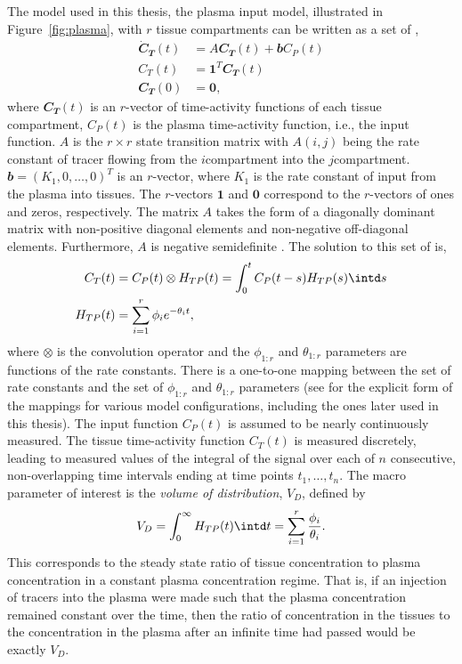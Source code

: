 The model used in this thesis, the plasma input model, illustrated in
Figure~\ref{fig:plasma}, with $r$ tissue compartments can be written as a set
of \ode,
\begin{align*}
  \dot{\mathbfit{C}}_{\mathbfit{T}}(t)
  & = A\mathbfit{C}_{\mathbfit{T}}(t) + \mathbfit{b} C_P(t)\\
  C_T(t)
  & = \mathbf{1}^T\mathbfit{C}_{\mathbfit{T}}(t) \\
  \mathbfit{C}_{\mathbfit{T}}(0) & = \mathbf{0},
\end{align*}
where $\mathbfit{C}_{\mathbfit{T}}(t)$ is an $r$-vector of time-activity
functions of each tissue compartment, $C_P(t)$ is the plasma time-activity
function, i.e., the input function. $A$ is the $r \times r$ state transition
matrix with $A(i,j)$ being the rate constant of tracer flowing from the
$i$\xth compartment into the $j$\xth compartment. $\mathbfit{b} = (K_1, 0,
\dots, 0)^T$ is an $r$-vector, where $K_1$ is the rate constant of input from
the plasma into tissues. The $r$-vectors $\mathbf{1}$ and $\mathbf{0}$
correspond to the $r$-vectors of ones and zeros, respectively. The matrix $A$
takes the form of a diagonally dominant matrix with non-positive diagonal
elements and non-negative off-diagonal elements. Furthermore, $A$ is negative
semidefinite \cite{Gunn:2001cx}. The solution to this set of \ode is,
\begin{align}
  C_T(t) & = C_P(t) \otimes H_{TP}(t) = \int_0^t C_P(t-s) H_{TP}(s)\intd s
  \label{eq:CT} \\
  H_{TP}(t) & = \sum_{i=1}^r \phi_i e^{-\theta_i t},
  \label{eq:HTP}
\end{align}
where $\otimes$ is the convolution operator and the $\phi_{1:r}$ and
$\theta_{1:r}$ parameters are functions of the rate constants. There is a
one-to-one mapping between the set of rate constants and the set of
$\phi_{1:r}$ and $\theta_{1:r}$ parameters (see \cite{Gunn:2001cx} for the
explicit form of the mappings for various model configurations, including the
ones later used in this thesis). The input function $C_P(t)$ is assumed to be
nearly continuously measured. The tissue time-activity function $C_T(t)$ is
measured discretely, leading to measured values of the integral of the signal
over each of $n$ consecutive, non-overlapping time intervals ending at time
points $t_1, \dots, t_n$. The macro parameter of interest is the \emph{volume
of distribution}, $V_D$, defined by
\begin{equation}
  V_D = \int_0^{\infty} H_{TP}(t) \intd t = \sum_{i=1}^r
  \frac{\phi_i}{\theta_i}.
\end{equation}
This corresponds to the steady state ratio of tissue concentration to
plasma concentration in a constant plasma concentration regime. That is, if
an injection of tracers into the plasma were made such that the plasma
concentration remained constant over the time, then the ratio of
concentration in the tissues to the concentration in the plasma after an
infinite time had passed would be exactly $V_D$.


